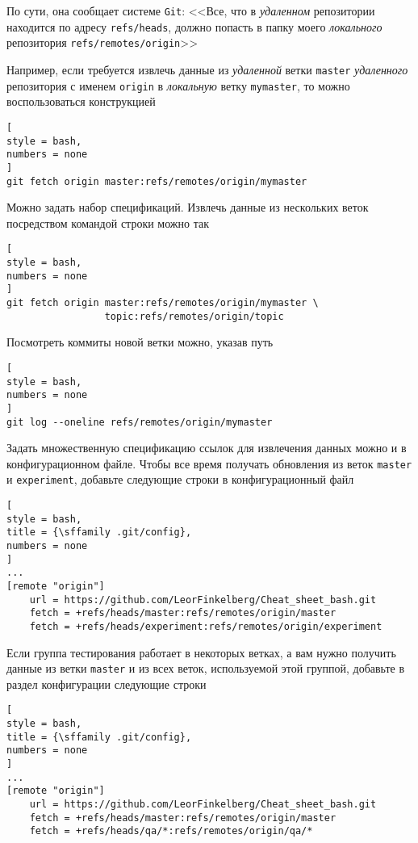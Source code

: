 \documentclass[%
	11pt,
	a4paper,
	utf8,
		]{article}
\begin{document}
По сути, она сообщает системе \texttt{Git}: <<Все, что в \emph{удаленном} репозитории находится по адресу \verb|refs/heads|, должно попасть в папку моего \emph{локального} репозитория \verb|refs/remotes/origin|>>

Например, если требуется извлечь данные из \emph{удаленной} ветки \texttt{master} \emph{удаленного} репозитория с именем \texttt{origin} в \emph{локальную} ветку \texttt{mymaster}, то можно воспользоваться конструкцией
\begin{lstlisting}[
style = bash,
numbers = none
]
git fetch origin master:refs/remotes/origin/mymaster
\end{lstlisting}

Можно задать набор спецификаций. Извлечь данные из нескольких веток посредством командой строки можно так
\begin{lstlisting}[
style = bash,
numbers = none
]
git fetch origin master:refs/remotes/origin/mymaster \
                 topic:refs/remotes/origin/topic
\end{lstlisting}

Посмотреть коммиты новой ветки можно, указав путь 
\begin{lstlisting}[
style = bash,
numbers = none
]
git log --oneline refs/remotes/origin/mymaster
\end{lstlisting}

Задать множественную спецификацию ссылок для извлечения данных можно и в конфигурационном файле. Чтобы все время получать обновления из веток \texttt{master} и \texttt{experiment}, добавьте следующие строки в конфигурационный файл
\begin{lstlisting}[
style = bash,
title = {\sffamily .git/config},
numbers = none
]
...
[remote "origin"]
    url = https://github.com/LeorFinkelberg/Cheat_sheet_bash.git
    fetch = +refs/heads/master:refs/remotes/origin/master
    fetch = +refs/heads/experiment:refs/remotes/origin/experiment
\end{lstlisting}

Если группа тестирования работает в некоторых ветках, а вам нужно получить данные из ветки \texttt{master} и из всех веток, используемой этой группой, добавьте в раздел конфигурации следующие строки
\begin{lstlisting}[
style = bash,
title = {\sffamily .git/config},
numbers = none
]
...
[remote "origin"]
    url = https://github.com/LeorFinkelberg/Cheat_sheet_bash.git
    fetch = +refs/heads/master:refs/remotes/origin/master
    fetch = +refs/heads/qa/*:refs/remotes/origin/qa/*
\end{lstlisting}
\end{document}
